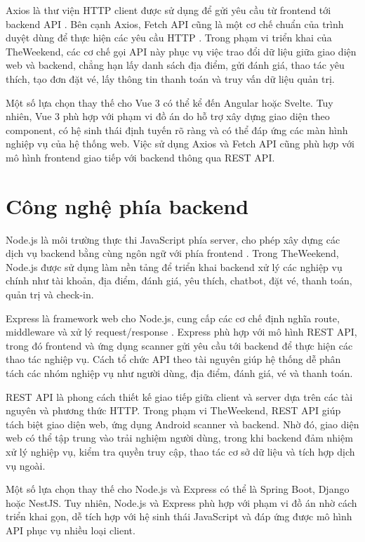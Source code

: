 \documentclass[../DoAn.tex]{subfiles}
\begin{document}
Axios là thư viện HTTP client được sử dụng để gửi yêu cầu từ frontend tới backend API \cite{axios_docs}. Bên cạnh Axios, Fetch API cũng là một cơ chế chuẩn của trình duyệt dùng để thực hiện các yêu cầu HTTP \cite{mdn_fetch_api}. Trong phạm vi triển khai của TheWeekend, các cơ chế gọi API này phục vụ việc trao đổi dữ liệu giữa giao diện web và backend, chẳng hạn lấy danh sách địa điểm, gửi đánh giá, thao tác yêu thích, tạo đơn đặt vé, lấy thông tin thanh toán và truy vấn dữ liệu quản trị.

Một số lựa chọn thay thế cho Vue 3 có thể kể đến Angular hoặc Svelte. Tuy nhiên, Vue 3 phù hợp với phạm vi đồ án do hỗ trợ xây dựng giao diện theo component, có hệ sinh thái định tuyến rõ ràng và có thể đáp ứng các màn hình nghiệp vụ của hệ thống web. Việc sử dụng Axios và Fetch API cũng phù hợp với mô hình frontend giao tiếp với backend thông qua REST API.

\section{Công nghệ phía backend}

Node.js là môi trường thực thi JavaScript phía server, cho phép xây dựng các dịch vụ backend bằng cùng ngôn ngữ với phía frontend \cite{nodejs_docs}. Trong TheWeekend, Node.js được sử dụng làm nền tảng để triển khai backend xử lý các nghiệp vụ chính như tài khoản, địa điểm, đánh giá, yêu thích, chatbot, đặt vé, thanh toán, quản trị và check-in.

Express là framework web cho Node.js, cung cấp các cơ chế định nghĩa route, middleware và xử lý request/response \cite{express_docs}. Express phù hợp với mô hình REST API, trong đó frontend và ứng dụng scanner gửi yêu cầu tới backend để thực hiện các thao tác nghiệp vụ. Cách tổ chức API theo tài nguyên giúp hệ thống dễ phân tách các nhóm nghiệp vụ như người dùng, địa điểm, đánh giá, vé và thanh toán.

REST API là phong cách thiết kế giao tiếp giữa client và server dựa trên các tài nguyên và phương thức HTTP. Trong phạm vi TheWeekend, REST API giúp tách biệt giao diện web, ứng dụng Android scanner và backend. Nhờ đó, giao diện web có thể tập trung vào trải nghiệm người dùng, trong khi backend đảm nhiệm xử lý nghiệp vụ, kiểm tra quyền truy cập, thao tác cơ sở dữ liệu và tích hợp dịch vụ ngoài.

Một số lựa chọn thay thế cho Node.js và Express có thể là Spring Boot, Django hoặc NestJS. Tuy nhiên, Node.js và Express phù hợp với phạm vi đồ án nhờ cách triển khai gọn, dễ tích hợp với hệ sinh thái JavaScript và đáp ứng được mô hình API phục vụ nhiều loại client.
\end{document}
